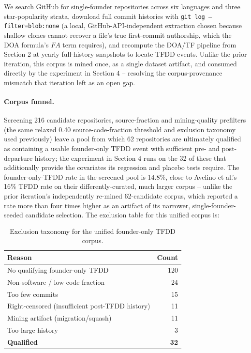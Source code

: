 \documentclass[11pt,letterpaper]{article}
\begin{document}
We search GitHub for single-founder repositories across six languages and three star-popularity strata, download full commit histories with \texttt{git log --filter=blob:none} (a local, GitHub-API-independent extraction chosen because shallow clones cannot recover a file's true first-commit authorship, which the DOA formula's $FA$ term requires), and recompute the DOA/TF pipeline from Section 2 at yearly full-history snapshots to locate TFDD events. Unlike the prior iteration, this corpus is mined once, as a single dataset artifact, and consumed directly by the experiment in Section 4 -- resolving the corpus-provenance mismatch that iteration left as an open gap.

\paragraph{Corpus funnel.} Screening 216 candidate repositories, source-fraction and mining-quality prefilters (the same relaxed 0.40 source-code-fraction threshold and exclusion taxonomy used previously) leave a pool from which 62 repositories are ultimately qualified as containing a usable founder-only TFDD event with sufficient pre- and post-departure history; the experiment in Section 4 runs on the 32 of these that additionally provide the covariates its regression and placebo tests require. The founder-only-TFDD rate in the screened pool is 14.8\%, close to Avelino et al.'s 16\% TFDD rate on their differently-curated, much larger corpus \citep{Avelino2019} -- unlike the prior iteration's independently re-mined 62-candidate corpus, which reported a rate more than four times higher as an artifact of its narrower, single-founder-seeded candidate selection. The exclusion table for this unified corpus is:

\begin{table}[!htbp]
\centering
\begin{tabular}{lr}
\toprule
Reason & Count \\
\midrule
No qualifying founder-only TFDD & 120 \\
Non-software / low code fraction & 24 \\
Too few commits & 15 \\
Right-censored (insufficient post-TFDD history) & 11 \\
Mining artifact (migration/squash) & 11 \\
Too-large history & 3 \\
\midrule
\textbf{Qualified} & \textbf{32} \\
\bottomrule
\end{tabular}
\caption{Exclusion taxonomy for the unified founder-only TFDD corpus.}
\label{tab:exclusion}
\end{table}
\end{document}
